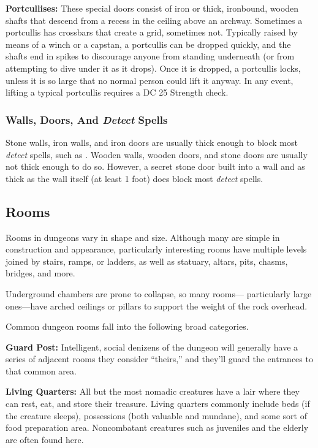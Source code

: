 \textbf{Portcullises:} These special doors consist of iron or thick, ironbound, wooden shafts that descend from a recess in the ceiling above an archway. Sometimes a portcullis has crossbars that create a grid, sometimes not. Typically raised by means of a winch or a capstan, a portcullis can be dropped quickly, and the shafts end in spikes to discourage anyone from standing underneath (or from attempting to dive under it as it drops). Once it is dropped, a portcullis locks, unless it is so large that no normal person could lift it anyway. In any event, lifting a typical portcullis requires a DC 25 Strength check.

\subsubsection{Walls, Doors, And \emph{Detect} Spells}
Stone walls, iron walls, and iron doors are usually thick enough to block most \emph{detect} spells, such as . Wooden walls, wooden doors, and stone doors are usually not thick enough to do so. However, a secret stone door built into a wall and as thick as the wall itself (at least 1 foot) does block most \emph{detect} spells.

\subsection{Rooms}
Rooms in dungeons vary in shape and size. Although many are simple in construction and appearance, particularly interesting rooms have multiple levels joined by stairs, ramps, or ladders, as well as statuary, altars, pits, chasms, bridges, and more.

Underground chambers are prone to collapse, so many rooms--- particularly large ones---have arched ceilings or pillars to support the weight of the rock overhead.

Common dungeon rooms fall into the following broad categories.

\textbf{Guard Post:} Intelligent, social denizens of the dungeon will generally have a series of adjacent rooms they consider ``theirs,'' and they'll guard the entrances to that common area.

\textbf{Living Quarters:} All but the most nomadic creatures have a lair where they can rest, eat, and store their treasure. Living quarters commonly include beds (if the creature sleeps), possessions (both valuable and mundane), and some sort of food preparation area. Noncombatant creatures such as juveniles and the elderly are often found here.

